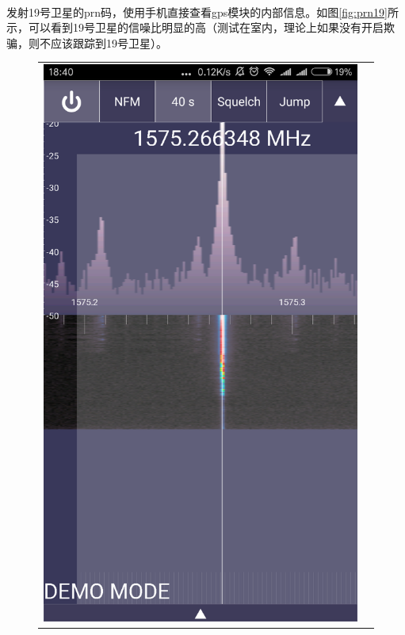 \documentclass[UTF8,titlepage]{ctexart}
\begin{document}
\paragraph*{}发射19号卫星的prn码，使用手机直接查看gps模块的内部信息。如图\ref{fig:prn19}所示，可以看到19号卫星的信噪比明显的高（测试在室内，理论上如果没有开启欺骗，则不应该跟踪到19号卫星）。
\begin{figure}[H]
  \begin{tabular}{cc}
    \begin{minipage}{.5\textwidth}
    \includegraphics[width = \textwidth]{rtlCar.eps}

\end{minipage}
\end{tabular}
\end{figure}
\end{document}
